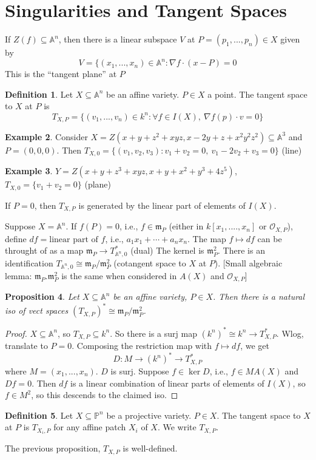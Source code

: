 \documentclass{article}
\theoremstyle{definition}
\newtheorem{defn}{Definition}[section]
\newtheorem{example}[defn]{Example}
\theoremstyle{remark}
\theoremstyle{plain}
\newtheorem{prop}[defn]{Proposition}
\newcommand{\PP}{\mathbb{P}}
\newcommand{\bA}{\mathbb{A}}
\begin{document}
\section{Singularities and Tangent Spaces}
If $Z(f)\subseteq\bA^n$, then there is a linear subspace $V$ at $P=(p_1,...,p_n)\in X$ given by
\[V=\{(x_1,...,x_n)\in\bA^n:\nabla f\cdot (x-P)=0\]
This is the ``tangent plane'' at $P$
\begin{defn}
    Let $X\subseteq\bA^n$ be an affine variety. $P\in X$ a point. The tangent space to $X$ at $P$ is 
    \[T_{X,P}=\{(v_1,...,v_n)\in k^n:\forall f\in I(X),\ \nabla f(p)\cdot v=0\}\]
\end{defn}
\begin{example}
    Consider $X=Z(x+y+z^2+xyz,x-2y+z+x^2y^2z^2)\subseteq\bA^3$ and $P=(0,0,0)$. Then $T_{X,0}=\{(v_1,v_2,v_3):v_1+v_2=0,\ v_1-2v_2+v_3=0\}$ (line)
\end{example}
\begin{example}
    $Y=Z(x+y+z^3+xyz,x+y+x^2+y^3+4z^5)$, $T_{X,0}=\{v_1+v_2=0\}$ (plane)
\end{example}
If $P=0$, then $T_{X,P}$ is generated by the linear part of elements of $I(X)$.

Suppose $X=\bA^n$. If $f(P)=0$, i.e., $f\in\mathfrak m_P$ (either in $k[x_1,....,x_n]$ or $\mathcal O_{X,P}$), define $df=\text{linear part of }f$, i.e., $a_1x_1+\cdots+a_nx_n$. The map $f\mapsto df$ can be throught of as a map $\mathfrak m_P\to T_{\bA^n,0}^\ast$ (dual) The kernel is $\mathfrak m_P^2$. There is an identification $T_{\bA^n,0}\cong\mathfrak m_P/\mathfrak m_P^2$ (cotangent space to $X$ at $P$).
[Small algebraic lemma: $\mathfrak m_P.\mathfrak m_P^2$ is the same when considered in $A(X)$ and $\mathcal O_{X,P}$]
\begin{prop}
    Let $X\subseteq\bA^n$ be an affine variety, $P\in X$. Then there is a natural iso of vect spaces $(T_{X,P})^\ast\cong\mathfrak m_P/\mathfrak m_P^2$.
\end{prop}
\begin{proof}
    $X\subseteq\bA^n$, so $T_{X,P}\subseteq k^n$. So there is a surj map $(k^n)^\ast\cong k^n\to T_{X,P}^\ast$. Wlog, translate to $P=0$. Composing the restriction map with $f\mapsto df$, we get
    \[D:M\to (k^n)^\ast\to T_{X,P}^\ast\]
    where $M=(x_1,...,x_n)$.
    $D$ is surj. Suppose $f\in\ker D$, i.e., $f\in MA(X)$ and $Df=0$. Then $df$ is a linear combination of linear parts of elements of $I(X)$, so $f\in M^2$, so this descends to the claimed iso.
\end{proof}
\begin{defn}
    Let $X\subseteq \PP^n$ be a projective variety. $P\in X$. The tangent space to $X$ at $P$ is $T_{X_i,P}$ for any affine patch $X_i$ of $X$. We write $T_{X,P}$.
\end{defn}
The previous proposition, $T_{X,P}$ is well-defined.
\end{document}
